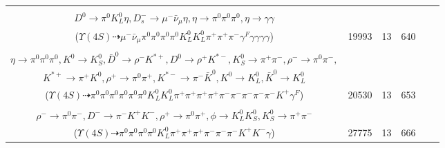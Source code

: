 \documentclass[landscape]{article}
\newcounter{rownumbers}
\newcommand\rn{\stepcounter{rownumbers}\arabic{rownumbers}}
\newcommand{\EOLP}{\\ \hline} %
\newcommand{\topoTags}[1]{#1} %
\begin{document}
\begin{longtable}{clcccc}
\rn & \makecell[l]{ $ 
\Upsilon(4S) \rightarrow B^{0} \bar{B}^{0} ,
B^{0} \rightarrow \pi^{+} D^{-} ,
\bar{B}^{0} \rightarrow D^{*+} D_{s}^{*-} \gamma ,
D^{-} \rightarrow K_{L}^{0} \pi^{-} \gamma^{F} ,
D^{*+} \rightarrow \pi^{+} D^{0} ,
D_{s}^{*-} \rightarrow D_{s}^{-} \gamma ,
$ \\ $
D^{0} \rightarrow \pi^{0} K_{L}^{0} \eta ,
D_{s}^{-} \rightarrow \mu^{-} \bar{\nu}_{\mu} \eta ,
\eta \rightarrow \pi^{0} \pi^{0} \pi^{0} ,
\eta \rightarrow \gamma \gamma 
$ \\ ($
\Upsilon(4S) \dashrightarrow \mu^{-} \bar{\nu}_{\mu} \pi^{0} \pi^{0} \pi^{0} \pi^{0} K_{L}^{0} K_{L}^{0} \pi^{+} \pi^{+} \pi^{-} \gamma^{F} \gamma \gamma \gamma \gamma 
$) } & \topoTags{19993 & }13 & 640 \EOLP

\rn & \makecell[l]{ $ 
\Upsilon(4S) \rightarrow B^{0} B^{0} ,
B^{0} \rightarrow K^{*+} D^{*-} D^{*0} ,
B^{0} \rightarrow \pi^{-} \eta K^{+} \gamma^{F} ,
K^{*+} \rightarrow \pi^{+} K^{0} ,
D^{*-} \rightarrow \pi^{-} \bar{D}^{0} ,
D^{*0} \rightarrow \pi^{0} D^{0} ,
$ \\ $
\eta \rightarrow \pi^{0} \pi^{0} \pi^{0} ,
K^{0} \rightarrow K_{S}^{0} ,
\bar{D}^{0} \rightarrow \rho^{-} K^{*+} ,
D^{0} \rightarrow \rho^{+} K^{*-} ,
K_{S}^{0} \rightarrow \pi^{+} \pi^{-} ,
\rho^{-} \rightarrow \pi^{0} \pi^{-} ,
$ \\ $
K^{*+} \rightarrow \pi^{+} K^{0} ,
\rho^{+} \rightarrow \pi^{0} \pi^{+} ,
K^{*-} \rightarrow \pi^{-} \bar{K}^{0} ,
K^{0} \rightarrow K_{L}^{0} ,
\bar{K}^{0} \rightarrow K_{L}^{0} 
$ \\ ($
\Upsilon(4S) \dashrightarrow \pi^{0} \pi^{0} \pi^{0} \pi^{0} \pi^{0} \pi^{0} K_{L}^{0} K_{L}^{0} \pi^{+} \pi^{+} \pi^{+} \pi^{+} \pi^{-} \pi^{-} \pi^{-} \pi^{-} \pi^{-} K^{+} \gamma^{F} 
$) } & \topoTags{20530 & }13 & 653 \EOLP

\rn & \makecell[l]{ $ 
\Upsilon(4S) \rightarrow B^{0} B^{0} ,
B^{0} \rightarrow D_{2}^{*-} D_{s}^{+} ,
B^{0} \rightarrow \rho^{+} \rho^{-} \gamma ,
D_{2}^{*-} \rightarrow \pi^{0} D^{-} ,
D_{s}^{+} \rightarrow \rho^{+} \phi ,
\rho^{+} \rightarrow \pi^{0} \pi^{+} ,
$ \\ $
\rho^{-} \rightarrow \pi^{0} \pi^{-} ,
D^{-} \rightarrow \pi^{-} K^{+} K^{-} ,
\rho^{+} \rightarrow \pi^{0} \pi^{+} ,
\phi \rightarrow K_{L}^{0} K_{S}^{0} ,
K_{S}^{0} \rightarrow \pi^{+} \pi^{-} 
$ \\ ($
\Upsilon(4S) \dashrightarrow \pi^{0} \pi^{0} \pi^{0} \pi^{0} K_{L}^{0} \pi^{+} \pi^{+} \pi^{+} \pi^{-} \pi^{-} \pi^{-} K^{+} K^{-} \gamma 
$) } & \topoTags{27775 & }13 & 666 \EOLP


\end{longtable}
\end{document}
